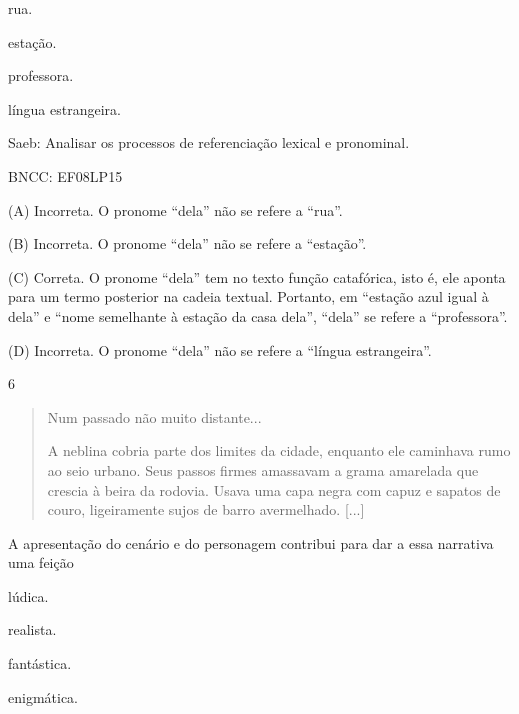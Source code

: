 \begin{escolha}
\item rua.

\item estação.

\item professora.

\item língua estrangeira.
\end{escolha}

Saeb: Analisar os processos de referenciação lexical e pronominal.

BNCC: EF08LP15

(A) Incorreta. O pronome ``dela'' não se refere a ``rua''.

(B) Incorreta. O pronome ``dela'' não se refere a ``estação''.

(C) Correta. O pronome ``dela'' tem no texto função catafórica, isto é,
ele aponta para um termo posterior na cadeia textual. Portanto, em
``estação azul igual à dela'' e ``nome semelhante à estação da casa
dela'', ``dela'' se refere a ``professora''.

(D) Incorreta. O pronome ``dela'' não se refere a ``língua
estrangeira''.

\num{6}

\begin{quote}
Num passado não muito distante...

A neblina cobria parte dos limites da cidade, enquanto ele caminhava
rumo ao seio urbano. Seus passos firmes amassavam a grama amarelada que
crescia à beira da rodovia. Usava uma capa negra com capuz e sapatos de
couro, ligeiramente sujos de barro avermelhado. {[}...{]}
\end{quote}


A apresentação do cenário e do personagem contribui para dar a essa
narrativa uma feição

\begin{escolha}
\item lúdica.

\item realista.

\item fantástica.

\item enigmática.
\end{escolha}

